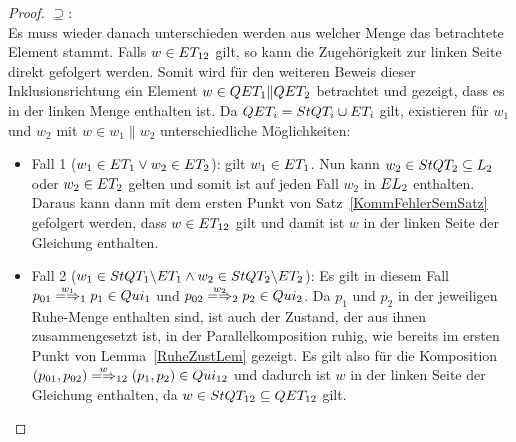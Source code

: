 \begin{proof}
  \glqq$\supseteq$\grqq{}:\\
  Es muss wieder danach unterschieden werden aus welcher Menge das betrachtete
  Element stammt. Falls $w\in ET _{12}$ gilt, so kann die Zugehörigkeit zur
  linken Seite direkt gefolgert werden. Somit wird für den weiteren Beweis
  dieser Inklusionsrichtung ein Element $w\in QET _1\|QET _2$ betrachtet und
  gezeigt, dass es in der linken Menge enthalten ist. Da $QET _i=StQT _i\cup
  ET _i$ gilt, existieren für $w_1$ und $w_2$ mit $w\in w_1\|w_2$
  unterschiedliche Möglichkeiten:
  \begin{itemize}
    \item Fall 1 ($w_1\in ET _1\lor w_2\in ET _2$): \OBdA{} gilt $w_1\in ET
      _1$. Nun kann $w_2\in StQT _2\subseteq L_2$ oder $w_2\in ET _2$ gelten
      und somit ist auf jeden Fall $w_2$ in $EL _2$ enthalten. Daraus kann
      dann mit dem ersten Punkt von Satz~\ref{KommFehlerSemSatz} gefolgert
      werden, dass $w\in ET _{12}$ gilt und damit ist $w$ in der linken Seite
      der Gleichung enthalten.
    \item Fall 2 ($w_1\in StQT _1\backslash ET _1\land w_2\in StQT _2\backslash
      ET _2$): Es gilt in diesem Fall $p_{01} \weakmay[w_1]_1 p_1\in Qui_1$
      und $p_{02} \weakmay[w_2]_2 p_2\in Qui_2$. Da $p_1$ und $p_2$ in der
      jeweiligen Ruhe-Menge enthalten sind, ist auch der Zustand, der aus ihnen
      zusammengesetzt ist, in der Parallelkomposition ruhig, wie bereits im
      ersten Punkt von Lemma~\ref{RuheZustLem} gezeigt. Es gilt also für die
      Komposition $(p_{01},p_{02}) \weakmay[w]_{12} (p_1,p_2)\in Qui_{12}$ und
      dadurch ist $w$ in der linken Seite der Gleichung enthalten, da $w\in
      StQT _{12}\subseteq QET _{12}$ gilt.
  \end{itemize}
\end{proof}


